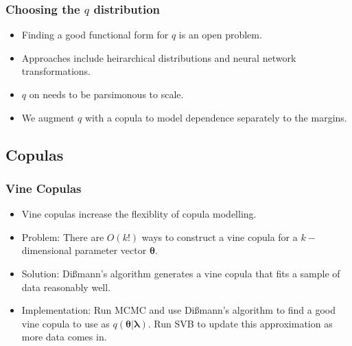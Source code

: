 \documentclass{beamer}\usepackage[]{graphicx}\usepackage[]{color}
\begin{document}
\begin{frame}
\frametitle{Choosing the $q$ distribution}
\begin{itemize}
\item Finding a good functional form for $q$ is an open problem.
\item Approaches include heirarchical distributions and neural network transformations.
\item $q$ on needs to be parsimonous to scale.
\item We augment $q$ with a copula to model dependence separately to the margins.
\end{itemize}
\end{frame}


\begin{frame}
\section{Copulas}
\frametitle{Vine Copulas}
\begin{itemize}
\item Vine copulas increase the flexiblity of copula modelling.
\vspace{3mm}
\item Problem: There are $O(k!)$ ways to construct a vine copula for a $k-$dimensional parameter vector $\boldsymbol{\theta}$.
\item Solution: Di{\ss}mann's algorithm generates a vine copula that fits a sample of data reasonably well.
\item Implementation: Run MCMC and use Di{\ss}mann's algorithm to find a good vine copula to use as $q(\boldsymbol{\theta} | \boldsymbol{\lambda})$. Run SVB to update this approximation as more data comes in.
\end{itemize}
\end{frame}
\end{document}
